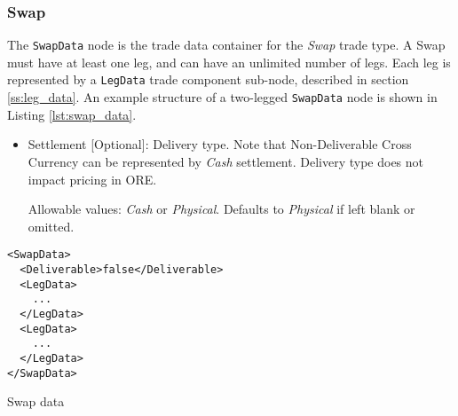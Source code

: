 \subsubsection{Swap}

The \lstinline!SwapData! node is the trade data container for the \emph{Swap} trade type. A Swap must have at least one leg,
and can have an unlimited number of legs. Each leg is represented by a \lstinline!LegData! trade component sub-node,
described in section \ref{ss:leg_data}. An example structure of a two-legged \lstinline!SwapData!
node is shown in Listing \ref{lst:swap_data}.
\begin{itemize}
\item Settlement [Optional]: Delivery type.  Note that Non-Deliverable Cross Currency can be represented by \emph{Cash} settlement. Delivery type does not impact pricing in ORE.  

Allowable values: \emph{Cash} or \emph{Physical}.  Defaults to \emph{Physical} if left blank or omitted.
\end{itemize}

\begin{listing}[H]
\begin{verbatim}
<SwapData>
  <Deliverable>false</Deliverable>
  <LegData>
    ...
  </LegData>
  <LegData>
    ...
  </LegData>
</SwapData>
\end{verbatim}
\caption{Swap data}
\label{lst:swap_data}
\end{listing}
